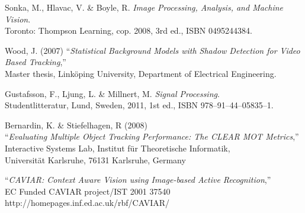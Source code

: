 \begin{thebibliography}{9}

	Sonka, M., Hlavac, V. \& Boyle, R. 
	\emph{Image Processing, Analysis, and Machine Vision}.\\
	Toronto: Thompson Learning,
	cop. 2008, 3rd ed.,
	ISBN 0495244384.
	
	Wood, J. (2007)
	``\textit{Statistical Background Models with Shadow Detection for Video Based Tracking},''\\
	Master thesis, Linköping University, Department of Electrical Engineering.	

	Gustafsson, F., Ljung, L. \& Millnert, M.
	\emph{Signal Processing}.\\
	Studentlitteratur, Lund, Sweden,
	2011, 1st ed.,
	ISBN 978--91--44--05835--1.

	Bernardin, K. \& Stiefelhagen, R (2008)\\
	``\textit{Evaluating Multiple Object Tracking Performance: The CLEAR MOT Metrics},''\\
	Interactive Systems Lab, Institut für Theoretische Informatik,\\
	Universität Karlsruhe, 76131 Karlsruhe, Germany

	``\textit{CAVIAR: Context Aware Vision using Image-based Active Recognition},''\\
	EC Funded CAVIAR project/IST 2001 37540\\
	http://homepages.inf.ed.ac.uk/rbf/CAVIAR/
	


\end{thebibliography}